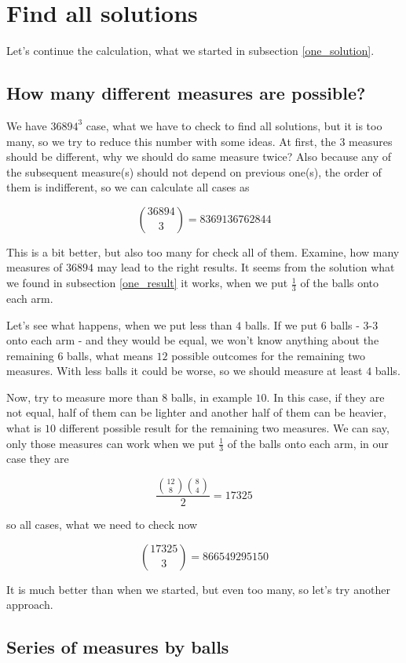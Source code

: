 \documentclass[11pt]{article} %
\begin{document}
\section{Find all solutions}

Let's continue the calculation, what we started in subsection \ref{one_solution}.

\subsection{How many different measures are possible?} \label{how_many}

We have $36894^3$ case, what we have to check to find all solutions, but it is too many, so we try to reduce this number with some ideas. At first, the $3$ measures should be different, why we should do same measure twice? Also because any of the subsequent measure(s) should not depend on previous one(s), the order of them is indifferent, so we can calculate all cases as

\[ \binom{36894}{3} = 8369136762844 \]

This is a bit better, but also too many for check all of them. Examine, how many measures of $36894$ may lead to the right results. It seems from the solution what we found in subsection \ref{one_result} it works, when we put $\frac{1}{3}$ of the balls onto each arm.

Let's see what happens, when we put less than $4$ balls. If we put $6$ balls - $3$-$3$ onto each arm - and they would be equal, we won't know anything about the remaining $6$ balls, what means $12$ possible outcomes for the remaining two measures. With less balls it could be worse, so we should measure at least $4$ balls. 

Now, try to measure more than $8$ balls, in example $10$. In this case, if they are not equal, half of them can be lighter and another half of them can be heavier, what is $10$ different possible result for the remaining two measures. We can say, only those measures can work when we put $\frac{1}{3}$ of the balls onto each arm, in our case they are

\[ \frac{\binom{12}{8}\binom{8}{4}}{2} = 17325 \]

so all cases, what we need to check now

\[ \binom{17325}{3} = 866549295150 \]

It is much better than when we started, but even too many, so let's try another approach.

\subsection{Series of measures by balls}
\end{document}
